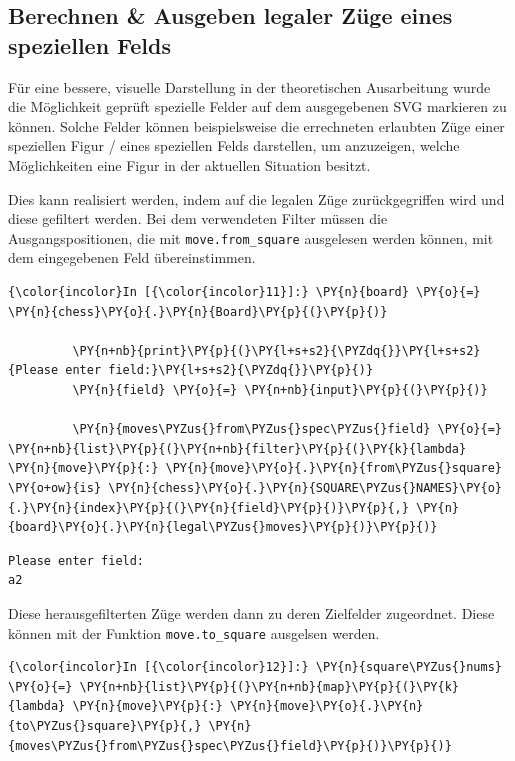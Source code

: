     \subsection{Berechnen \& Ausgeben legaler Züge eines speziellen
Felds}\label{berechnen-ausgeben-legaler-zuxfcge-eines-speziellen-felds}

Für eine bessere, visuelle Darstellung in der theoretischen Ausarbeitung
wurde die Möglichkeit geprüft spezielle Felder auf dem ausgegebenen SVG
markieren zu können. Solche Felder können beispielsweise die errechneten
erlaubten Züge einer speziellen Figur / eines speziellen Felds
darstellen, um anzuzeigen, welche Möglichkeiten eine Figur in der
aktuellen Situation besitzt.

Dies kann realisiert werden, indem auf die legalen Züge zurückgegriffen
wird und diese gefiltert werden. Bei dem verwendeten Filter müssen die
Ausgangspositionen, die mit \texttt{move.from\_square} ausgelesen werden
können, mit dem eingegebenen Feld übereinstimmen.

    \begin{Verbatim}[commandchars=\\\{\}]
{\color{incolor}In [{\color{incolor}11}]:} \PY{n}{board} \PY{o}{=} \PY{n}{chess}\PY{o}{.}\PY{n}{Board}\PY{p}{(}\PY{p}{)}
         
         \PY{n+nb}{print}\PY{p}{(}\PY{l+s+s2}{\PYZdq{}}\PY{l+s+s2}{Please enter field:}\PY{l+s+s2}{\PYZdq{}}\PY{p}{)}
         \PY{n}{field} \PY{o}{=} \PY{n+nb}{input}\PY{p}{(}\PY{p}{)}
         
         \PY{n}{moves\PYZus{}from\PYZus{}spec\PYZus{}field} \PY{o}{=} \PY{n+nb}{list}\PY{p}{(}\PY{n+nb}{filter}\PY{p}{(}\PY{k}{lambda} \PY{n}{move}\PY{p}{:} \PY{n}{move}\PY{o}{.}\PY{n}{from\PYZus{}square} \PY{o+ow}{is} \PY{n}{chess}\PY{o}{.}\PY{n}{SQUARE\PYZus{}NAMES}\PY{o}{.}\PY{n}{index}\PY{p}{(}\PY{n}{field}\PY{p}{)}\PY{p}{,} \PY{n}{board}\PY{o}{.}\PY{n}{legal\PYZus{}moves}\PY{p}{)}\PY{p}{)}
\end{Verbatim}


    \begin{Verbatim}[commandchars=\\\{\}]
Please enter field:
a2

    \end{Verbatim}

    Diese herausgefilterten Züge werden dann zu deren Zielfelder zugeordnet.
Diese können mit der Funktion \texttt{move.to\_square} ausgelsen werden.

    \begin{Verbatim}[commandchars=\\\{\}]
{\color{incolor}In [{\color{incolor}12}]:} \PY{n}{square\PYZus{}nums} \PY{o}{=} \PY{n+nb}{list}\PY{p}{(}\PY{n+nb}{map}\PY{p}{(}\PY{k}{lambda} \PY{n}{move}\PY{p}{:} \PY{n}{move}\PY{o}{.}\PY{n}{to\PYZus{}square}\PY{p}{,} \PY{n}{moves\PYZus{}from\PYZus{}spec\PYZus{}field}\PY{p}{)}\PY{p}{)}
\end{Verbatim}


